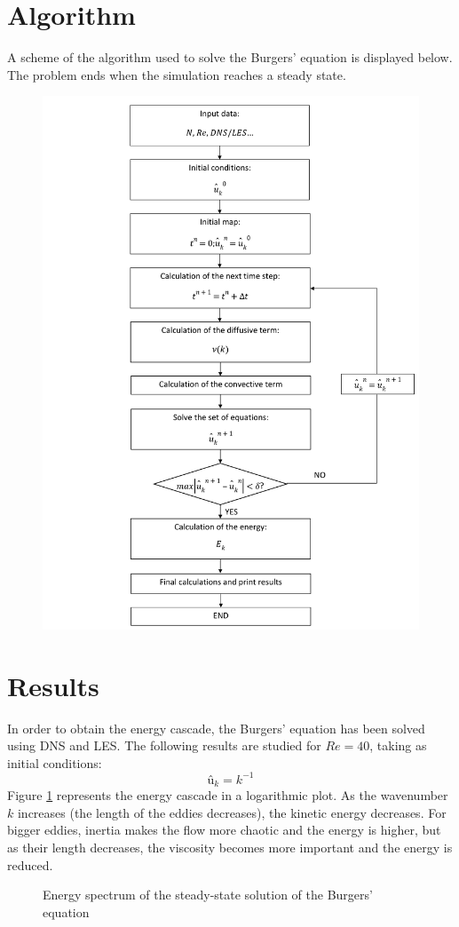 \section{Algorithm}
A scheme of the algorithm used to solve the Burgers' equation is displayed below. The problem ends when the simulation reaches a steady state.
\begin{figure}[H]
	\includegraphics[scale=0.15]{Burgers/Doc5}
\end{figure}

\section{Results}
In order to obtain the energy cascade, the Burgers' equation has been solved using DNS and LES. The following results are studied for $Re=40$, taking as initial conditions:
\begin{equation}
û_{k}=k^{-1}
\end{equation}
Figure \ref{BurgersResults} represents the energy cascade in a logarithmic plot. As the wavenumber $k$ increases (the length of the eddies decreases), the kinetic energy decreases. For bigger eddies, inertia makes the flow more chaotic and the energy is higher, but as their length decreases, the viscosity becomes more important and the energy is reduced.
\begin{figure}[h]
	\centering
	
	\caption{Energy spectrum of the steady-state solution of the Burgers' equation}
	\label{BurgersResults}
\end{figure}

